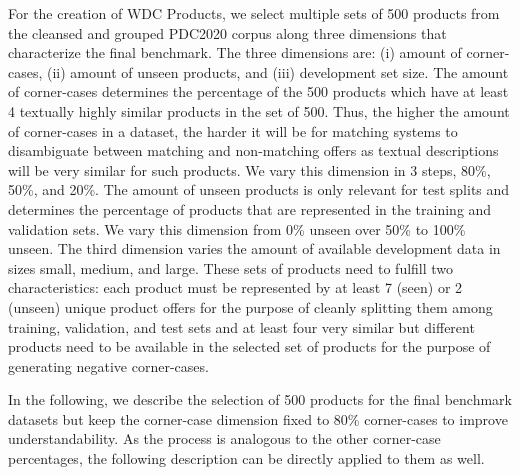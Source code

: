 \documentclass[sigconf,edbt]{acmart-edbt2024}
\begin{document}
For the creation of WDC Products, we select multiple sets of 500 products from the cleansed and grouped PDC2020 corpus along three dimensions that characterize the final benchmark. The three dimensions are: (i) amount of corner-cases, (ii) amount of unseen products, and (iii) development set size. The amount of corner-cases determines the percentage of the 500 products which have at least 4 textually highly similar products in the set of 500. Thus, the higher the amount of corner-cases in a dataset, the harder it will be for matching systems to disambiguate between matching and non-matching offers as textual descriptions will be very similar for such products. We vary this dimension in 3 steps, 80\%, 50\%, and 20\%. The amount of unseen products is only relevant for test splits and determines the percentage of products that are represented in the training and validation sets. We vary this dimension from 0\% unseen over 50\% to 100\% unseen. The third dimension varies the amount of available development data in sizes small, medium, and large. These sets of products need to fulfill two characteristics: each product must be represented by at least 7 (seen) or 2 (unseen) unique product offers for the purpose of cleanly splitting them among training, validation, and test sets and at least four very similar but different products need to be available in the selected set of products for the purpose of generating negative corner-cases.

In the following, we describe the selection of 500 products for the final benchmark datasets but keep the corner-case dimension fixed to 80\% corner-cases to improve understandability. As the process is analogous to the other corner-case percentages, the following description can be directly applied to them as well.
\end{document}
